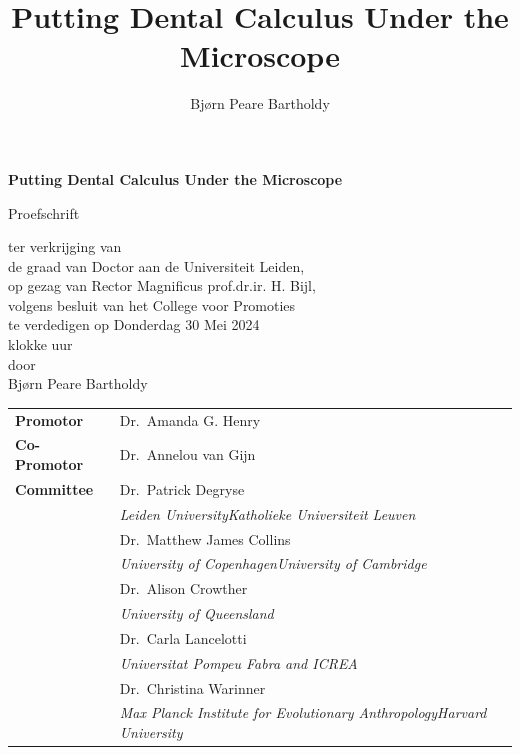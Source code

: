 \documentclass[
  b5paper,
]{book}
\title{Putting Dental Calculus Under the Microscope}
\author{Bjørn Peare Bartholdy}
\date{}
\begin{document}
\clearpage
\thispagestyle{empty}
\begin{center}
\Huge\textbf{Putting Dental Calculus Under the Microscope}\par
\vspace{\baselineskip}
\huge\textit{}\par
\vfill %
    \Large{Proefschrift}\par
    \vspace{\baselineskip}
    \linespread{1.3}
    \large{ter verkrijging van \\
    de graad van Doctor aan de Universiteit Leiden, \\
    op gezag van Rector Magnificus prof.dr.ir. H. Bijl, \\
    volgens besluit van het College voor Promoties \\
    te verdedigen op Donderdag 30 Mei 2024 \\
    klokke  uur \\[1.5cm]
    door} \\[1.5cm]
    \Large{Bjørn Peare Bartholdy}\par
\end{center}

\clearpage
\thispagestyle{empty}

\noindent\begin{tabular}{p{8em} l}
    \large
    \textbf{Promotor}  & \large Dr.~Amanda G. Henry  \\ 
    \rule{0pt}{4ex}\large\textbf{Co-Promotor}  & \large Dr.~Annelou van
Gijn  \\ 
    \large
    \rule{0pt}{8ex}\textbf{Committee}  & \rule{0pt}{4ex}\large Dr.~Patrick
Degryse  \\
    & \indent\textit{Leiden UniversityKatholieke Universiteit
Leuven} \\  & \rule{0pt}{4ex}\large Dr.~Matthew James Collins  \\
    & \indent\textit{University of CopenhagenUniversity of
Cambridge} \\  & \rule{0pt}{4ex}\large Dr.~Alison Crowther  \\
    & \indent\textit{University of
Queensland} \\  & \rule{0pt}{4ex}\large Dr.~Carla Lancelotti  \\
    & \indent\textit{Universitat Pompeu Fabra and
ICREA} \\  & \rule{0pt}{4ex}\large Dr.~Christina Warinner  \\
    & \indent\textit{Max Planck Institute for Evolutionary
AnthropologyHarvard University} \\ 
\end{tabular}
\end{document}
